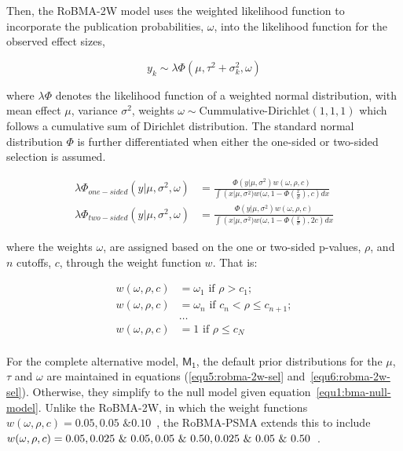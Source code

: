 \documentclass[12pt, english]{article}
\begin{document}
    Then, the RoBMA-2W model uses the weighted likelihood function to incorporate the publication probabilities, $\omega$, into the likelihood function for the observed effect sizes,

    \begin{equation}
        \label{equ4:robma-2w}
        y_k \sim \lambda\Phi \left(\mu, \tau^{2} + \sigma_k^{2}, \omega \right)
    \end{equation}

    where $\lambda \Phi$ denotes the likelihood function of a weighted normal distribution, with mean effect $\mu$, variance $\sigma^2$, weights $\omega \sim \text{Cummulative-Dirichlet}(1,1,1)$ which follows a cumulative sum of Dirichlet distribution. The standard normal distribution $\Phi$ is further differentiated when either the one-sided or two-sided selection is assumed.

    \begin{align}
        \lambda\Phi_{one-sided}(y | \mu, \sigma^{2}, \omega) &= \frac{\Phi(y | \mu, \sigma^{2}) w(\omega, \rho, c)}{\int \left(x | \mu, \sigma^{2}) w(\omega, 1 - \Phi(\frac{x}{\sigma}), c \right) dx} \label{equ5:robma-2w-sel} \\
        \lambda\Phi_{two-sided}(y | \mu, \sigma^{2}, \omega) &= \frac{\Phi(y | \mu, \sigma^{2}) w(\omega, \rho,  c)}{\int \left(x | \mu, \sigma^{2}) w(\omega, 1 - \Phi(\frac{x}{\sigma}), 2c \right) dx} \label{equ6:robma-2w-sel}
    \end{align}

    where the weights $\omega$, are assigned based on the one or two-sided p-values, $\rho$, and $n$ cutoffs, $c$, through the weight function $w$. That is:

    \begin{equation}
        \begin{split}
            \label{equ7:robma-2w-cutoffs}
            w(\omega, \rho, c) &= \omega_1 \text{ if } \rho > c_1; \\
            w(\omega, \rho, c) &= \omega_n \text{ if } c_n < \rho \leqslant c_{n + 1}; \\
            &\dots \\
            w(\omega, \rho, c) &= 1 \text{ if } \rho \leqslant c_N \\
        \end{split}
    \end{equation}

    For the complete alternative model, $\mathsf{M_1}$, the default prior distributions for the $\mu$, $\tau$ and $\omega$ are maintained in equations (\ref{equ5:robma-2w-sel} and~\ref{equ6:robma-2w-sel}). Otherwise, they simplify to the null model given equation~\ref{equ1:bma-null-model}. Unlike the RoBMA-2W, in which the weight functions $w(\omega, \rho, c) = 0.05, 0.05 \text{ \& } 0.10$~\parencite{maier2022}, the RoBMA-PSMA extends this to include $w(\omega,\rho, c) = 0.05, \break 0.025 \text{ \& } 0.05, 0.05 \text{ \& } 0.50, 0.025 \text{ \& } 0.05\text{ \& }0.50$~\parencite{bartos2022}.
\end{document}
